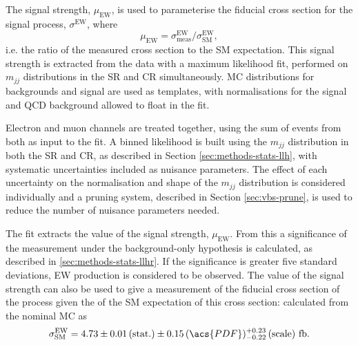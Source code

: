 
The signal strength, $\mu_\text{EW}$, is used to parameterise the fiducial
cross section for the signal process, $\sigma^\text{EW}$, where
%
\begin{equation}
  \mu_\text{EW} = \sigma^\text{EW}_\text{meas} / \sigma^\text{EW}_\text{SM},
  \label{eqn:vbs-fit-mu}
\end{equation}
%
i.e. the ratio of the measured cross section to the \ac{SM} expectation. This
signal strength is extracted from the data with a maximum likelihood fit,
performed on $m_{jj}$ distributions in the \ac{SR} and \ac{CR} simultaneously.
\ac{MC} distributions for backgrounds and signal are used as templates, with
normalisations for the signal and \ac{QCD} \Zy background allowed to float in
the fit.

Electron and muon channels are treated together, using the sum of events from
both as input to the fit. A binned likelihood is built using
the $m_{jj}$ distribution in both the \ac{SR} and \ac{CR}, as described in
Section \ref{sec:methods-stats-llh}, with systematic uncertainties included as
nuisance parameters.
The effect of each uncertainty on the normalisation and shape of the
$m_{jj}$ distribution is considered individually and a pruning system, described
in Section \ref{sec:vbs-prune}, is used to reduce the number of nuisance
parameters needed.

The fit extracts the value of the signal strength, $\mu_\text{EW}$.
From this a significance of the measurement under the background-only hypothesis
is calculated, as described in \ref{sec:methods-stats-llhr}.
If the significance is greater five standard deviations, \ac{EW} \Zy
production is considered to be observed. The value of the signal strength can
also be used to give a measurement of the fiducial cross section of the process
given the of the \ac{SM} expectation of this cross section: calculated from the
nominal \ac{MC} as
%
\begin{equation*}
  \sigma^\text{EW}_\text{SM} = 4.73
  \pm 0.01 \, (\text{stat.})
  \pm 0.15 \, (\acs{PDF})
  ^{+0.23} _{-0.22} \, (\text{scale})
  ~\text{fb}.
\end{equation*}

